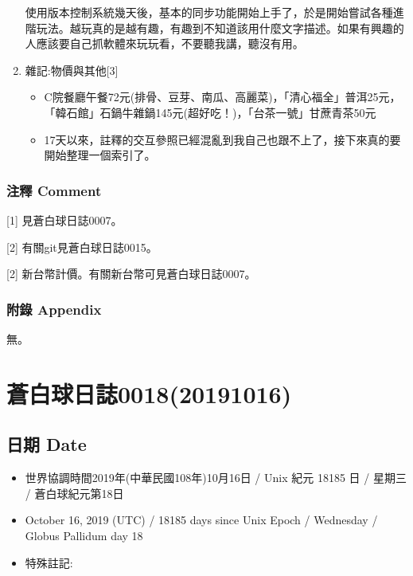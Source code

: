 \documentclass[a5paper, 12pt
]{book}
\providecommand{\tightlist}{%
  \setlength{\itemsep}{0pt}\setlength{\parskip}{0pt}}
\begin{document}
\begin{enumerate}
  使用版本控制系統幾天後，基本的同步功能開始上手了，於是開始嘗試各種進階玩法。越玩真的是越有趣，有趣到不知道該用什麼文字描述。如果有興趣的人應該要自己抓軟體來玩玩看，不要聽我講，聽沒有用。
\item
  雜記:物價與其他{[}3{]}

  \begin{itemize}
  \tightlist
  \item
    C院餐廳午餐72元(排骨、豆芽、南瓜、高麗菜)，「清心福全」普洱25元，「韓石館」石鍋牛雜鍋145元(超好吃！)，「台茶一號」甘蔗青茶50元
  \item
    17天以來，註釋的交互參照已經混亂到我自己也跟不上了，接下來真的要開始整理一個索引了。
  \end{itemize}
\end{enumerate}

\hypertarget{ux6ce8ux91cb-comment-10}{%
\subsubsection{注釋 Comment}\label{ux6ce8ux91cb-comment-10}}

{[}1{]} 見蒼白球日誌0007。

{[}2{]} 有關git見蒼白球日誌0015。

{[}2{]} 新台幣計價。有關新台幣可見蒼白球日誌0007。

\hypertarget{ux9644ux9304-appendix-9}{%
\subsubsection{附錄 Appendix}\label{ux9644ux9304-appendix-9}}

無。

\hypertarget{ux84bcux767dux7403ux65e5ux8a8c001820191016}{%
\section{蒼白球日誌0018(20191016)}\label{ux84bcux767dux7403ux65e5ux8a8c001820191016}}

\hypertarget{ux65e5ux671f-date-17}{%
\subsection{日期 Date}\label{ux65e5ux671f-date-17}}

\begin{itemize}
\tightlist
\item
  世界協調時間2019年(中華民國108年)10月16日 / Unix 紀元 18185 日 /
  星期三 / 蒼白球紀元第18日
\item
  October 16, 2019 (UTC) / 18185 days since Unix Epoch / Wednesday /
  Globus Pallidum day 18
\item
  特殊註記:
\end{itemize}
\end{document}
